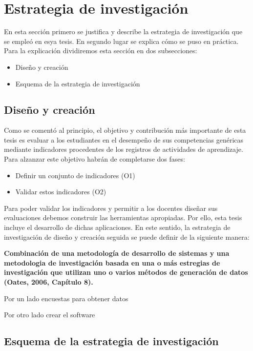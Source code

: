 
\section{Estrategia de investigación}
\label{sec:Estrategia}



En esta sección primero se justifica y describe la estrategia de investigación que se empleó en esya tesis. En segundo lugar se explica cómo se puso en práctica. Para la explicación dividiremos esta sección en dos subsecciones:

\begin{itemize}
\item Diseño y creación
\item Esquema de la estrategia de investigación
\end{itemize}

\subsection{Diseño y creación}

Como se comentó al principio, el objetivo y contribución más importante de esta tesis es evaluar a los estudiantes en el desempeño de sus competencias genéricas mediante indicadores procedentes de los registros de actividades de aprendizaje. Para alzanzar este objetivo habrán de completarse dos fases:

\begin{itemize}
\item Definir un conjunto de indicadores (O1)
\item Validar estos indicadores (O2)
\end{itemize}

Para poder validar los indicadores y permitir a los docentes diseñar sus evaluaciones debemos construir las herramientas apropiadas. Por ello, esta tesis incluye el desarrollo de dichas aplicaciones.  En este sentido, la estrategia de investigación de diseño y creación seguida se puede definir de la siguiente manera:

\textbf{Combinación de una metodología de desarrollo de sistemas y una metodologia de investigación basada en una o más estregias de investigación que utilizan uno o varios métodos de generación de datos (Oates, 2006, Capítulo 8).}

Por un lado encuestas para obtener datos

Por otro lado crear el software

\subsection{Esquema de la estrategia de investigación}